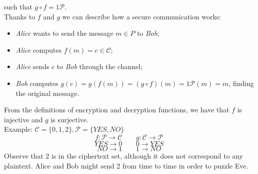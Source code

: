 \documentclass[a4paper, 10pt, titlepage]{article}
\begin{document}
such that $g \circ f = 1 \mathcal{P}$. \medskip \\
Thanks to $f$ and $g$ we can describe how a secure communication works:
\begin{itemize}
\item \textit{Alice} wants to send the message $m \in P$ to \textit{Bob};
\item \textit{Alice} computes $f(m) = c \in \mathcal{C}$;
\item \textit{Alice} sends $c$ to \textit{Bob} through the channel;
\item \textit{Bob} computes $g(c) = g(f(m)) = (g \circ f )(m) = 1\mathcal{P} (m) = m$, finding the original message.
\end{itemize}
From the definitions of encryption and decryption functions, we have that $f$ is injective and $g$ is surjective. \medskip \\
Example: $\mathcal{C}=\{0,1,2\}, \mathcal{P}=\{YES, NO\}$
$$f : \mathcal{P} \rightarrow \mathcal{C} \quad \quad g : \mathcal{C}  \rightarrow \mathcal{P}$$
$$YES \rightarrow 0 \quad \quad 0 \rightarrow YES$$
$$NO \rightarrow 1 \quad \quad 1 \rightarrow NO$$
Observe that 2 is in the ciphertext set, although it does not correspond to any plaintext. Alice and Bob might send 2 from time to time in order to puzzle Eve.
\end{document}
